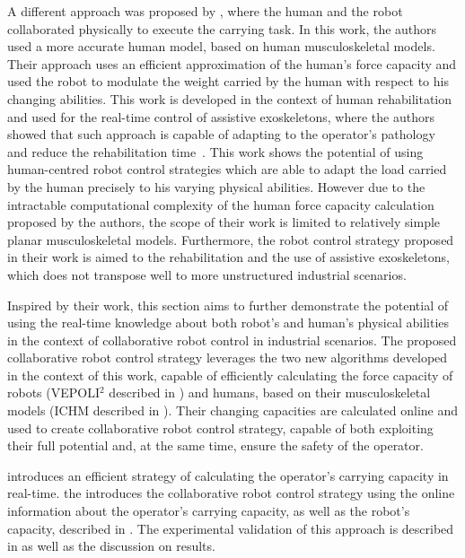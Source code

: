 A different approach was proposed by \citet{carmichael2013admittance}, where the human and the robot collaborated physically to execute the carrying task. In this work, the authors used a more accurate human model, based on human musculoskeletal models. Their approach uses an efficient approximation of the human's force capacity and used the robot to modulate the weight carried by the human with respect to his changing abilities. This work is developed in the context of human rehabilitation and used for the real-time control of assistive exoskeletons, where the authors showed that such approach is capable of adapting to the operator's pathology and reduce the rehabilitation time~\cite{Carmichael2013Experimental}. 
This work shows the potential of using human-centred robot control strategies which are able to adapt the load carried by the human precisely to his varying physical abilities. However due to the intractable computational complexity of the human force capacity calculation proposed by the authors, the scope of their work is limited to relatively simple planar musculoskeletal models. Furthermore, the robot control strategy proposed in their work is aimed to the rehabilitation and the use of assistive exoskeletons, which does not transpose well to more unstructured industrial scenarios.

Inspired by their work, this section aims to further demonstrate the potential of using the real-time knowledge about both robot's and human's physical abilities in the context of collaborative robot control in industrial scenarios. The proposed collaborative robot control strategy leverages the two new algorithms developed in the context of this work, capable of efficiently calculating the force capacity of robots (VEPOLI$^2$ described in ) and humans, based on their musculoskeletal models (ICHM described in ). 
Their changing capacities are calculated online and used to create collaborative robot control strategy, capable of both exploiting their full potential and, at the same time, ensure the safety of the operator. 

 introduces an efficient strategy of calculating the operator's carrying capacity in real-time.  the introduces the collaborative robot control strategy using the online information about the operator's carrying capacity, as well as the robot's capacity, described in  . The experimental validation of this approach is described in   as well as the discussion on results.

